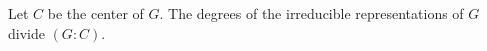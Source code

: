 Let $C$ be the center of $G$. The degrees of the irreducible representations of $G$ divide $(G : C)$.
